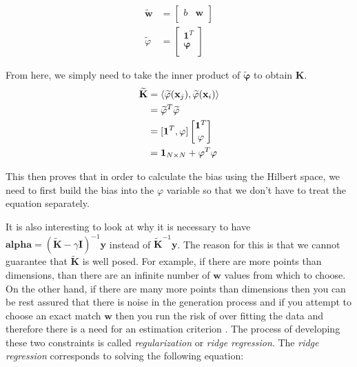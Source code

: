 \documentclass[11pt, twoside]{article}   	%
\begin{document}
\begin{align*}
 \mathbf{\widetilde{w}} &= 
\begin{bmatrix}
b & \mathbf{w}  \\
\end{bmatrix} \\
\widetilde{\varphi} &= 
\begin{bmatrix} 
\mathbf{1}^T \\
\mathbf{\varphi} \\
\end{bmatrix}
\end{align*}

From here, we simply need to take the inner product of $\mathbf{\widetilde{\varphi}}$ to obtain $\mathbf{K}$. 
\begin{align*}
 \widetilde{\mathbf{K} }&= \langle \mathbf{\widetilde{\varphi}}(\mathbf{x}_j), \mathbf{\widetilde{\varphi}}(\mathbf{x}_i) \rangle \\
 & = \mathbf{\widetilde{\varphi}}^T\mathbf{\widetilde{\varphi}} \\
 &= [\mathbf{1}^T, \mathbf{\varphi}] 
 \begin{bmatrix}
 \mathbf{1}^T \\
\mathbf{\varphi} \\
 \end{bmatrix} \\
 &= \mathbf{1}_{N \times N} + \mathbf{\varphi}^T\mathbf{\varphi}
\end{align*}

This then proves that in order to calculate the bias using the Hilbert space, we need to first
build the bias into the $\varphi$ variable so that we don't have to treat the equation separately. 

It is also interesting to look at why it is necessary to have $\mathbf{alpha} = (\mathbf{\widetilde{K}} - \gamma \mathbf{I})^{-1} \mathbf{y}$ 
instead of $\mathbf{\widetilde{K}}^{-1}\mathbf{y}$. The reason for this is that we cannot guarantee that $\mathbf{\widetilde{K}}$ is well posed. 
For example, if there are more points than dimensions, than there are an infinite number of $\mathbf{w}$ values from which to choose. On 
the other hand, if there are many more points than dimensions then you can be rest assured that there is noise in the generation process 
and if you attempt to choose an exact match $\mathbf{w}$ then you run the risk of over fitting the data and therefore there is a need for an 
estimation criterion \cite{kernelmethods}. The process of developing these two constraints is called \emph{regularization} or \emph{ridge regression}. 
The \emph{ridge regression} corresponds to solving the following equation: 
\end{document}
